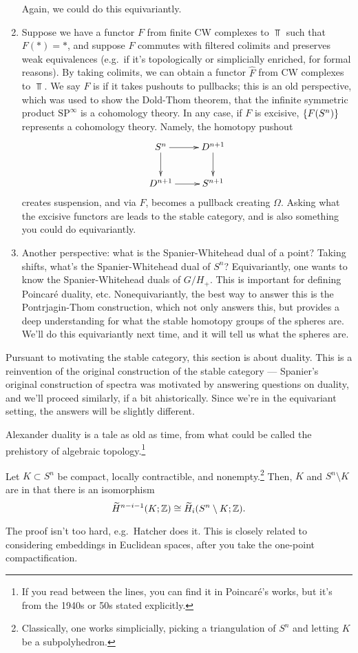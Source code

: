 \begin{enumerate}
	Again, we could do this equivariantly.
	\item Suppose we have a functor $F$ from finite CW complexes to $\Top$ such that $F(*) = *$, and suppose $F$
	commutes with filtered colimits and preserves weak equivalences (e.g.\ if it's topologically or simplicially
	enriched, for formal reasons). By taking colimits, we can obtain a functor $\widehat F$ from CW complexes to
	$\Top$. We say $F$ is  if it takes pushouts to pullbacks; this is an old perspective, which was
	used to show the Dold-Thom theorem, that the infinite symmetric product $\mathrm{SP}^\infty$ is a cohomology
	theory. In any case, if $F$ is excisive, $\{F(S^n)\}$ represents a cohomology theory. Namely, the homotopy
	pushout
	\[\xymatrix{S^n\ar[r]\ar[d] & D^{n+1}\ar[d]\\
	D^{n+1}\ar[r] & S^{n+1}
	}\]
	creates suspension, and via $F$, becomes a pullback creating $\Omega$. Asking what the excisive functors are
	leads to the stable category, and is also something you could do equivariantly.
	\item Another perspective: what is the Spanier-Whitehead dual of a point? Taking shifts, what's the
	Spanier-Whitehead dual of $S^n$? Equivariantly, one wants to know the Spanier-Whitehead duals of $G/H_+$. This
	is important for defining Poincaré duality, etc. Nonequivariantly, the best way to answer this is the
	Pontrjagin-Thom construction, which not only answers this, but provides a deep understanding for what the
	stable homotopy groups of the spheres are. We'll do this equivariantly next time, and it will tell us what the
	spheres are.
\end{enumerate}
Pursuant to motivating the stable category, this section is about duality. This is a reinvention of the original
construction of the stable category --- Spanier's original construction of spectra was motivated by answering
questions on duality, and we'll proceed similarly, if a bit ahistorically. Since we're in the equivariant setting,
the answers will be slightly different.

Alexander duality is a tale as old as time, from what could be called the prehistory of algebraic
topology.\footnote{If you read between the lines, you can find it in Poincaré's works, but it's from the 1940s or
50s stated explicitly.}
\begin{thm}
Let $K\subset S^n$ be compact, locally contractible, and nonempty.\footnote{Classically, one works simplicially,
picking a triangulation of $S^n$ and letting $K$ be a subpolyhedron.} Then, $K$ and $S^n\setminus K$ are
 in that there is an isomorphism
\[\widetilde H^{n-i-1}(K;\mathbb Z)\cong \widetilde H_i(S^n\setminus K;\mathbb Z).\]
\end{thm}
The proof isn't too hard, e.g.\ Hatcher does it. This is closely related to considering embeddings in Euclidean
spaces, after you take the one-point compactification.

